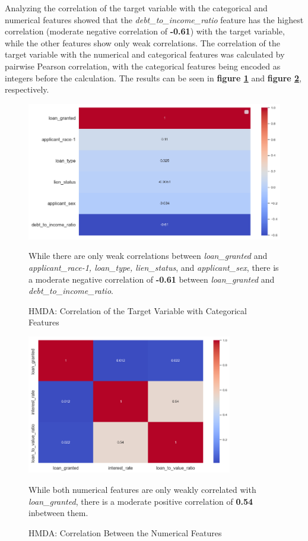 Analyzing the correlation of the target variable with the categorical and numerical features showed that the \textit{debt\_to\_income\_ratio} feature has the highest correlation (moderate negative correlation of \textbf{-0.61}) with the target variable, while the other features show only weak correlations. 
The correlation of the target variable with the numerical and categorical features was calculated by pairwise Pearson correlation, with the categorical features being encoded as integers before the calculation.
The results can be seen in \textbf{figure \ref{fig:CHXX_Target_Correlation_Categorical}} and \textbf{figure \ref{fig:CHXX_Target_Correlation_Numerical}}, respectively.

\begin{figure}[hbt!]
    \centering
    \includegraphics[width=1\textwidth]{images/CHXX_Target_Correlation_Categorical.png}
    \caption{HMDA: Correlation of the Target Variable with Categorical Features}
    \medskip
    \small
    While there are only weak correlations between \textit{loan\_granted} and \textit{applicant\_race-1, loan\_type, lien\_status}, and \textit{applicant\_sex}, there is a moderate negative correlation of \textbf{-0.61} between \textit{loan\_granted} and \textit{debt\_to\_income\_ratio}.
    \label{fig:CHXX_Target_Correlation_Categorical}
\end{figure}

\begin{figure}[!htbp]
    \centering
    \includegraphics[width=0.8\textwidth]{images/CHXX_Target_Correlation_Numerical.png}
    \caption{HMDA: Correlation Between the Numerical Features}
    \medskip
    \small
    While both numerical features are only weakly correlated with \textit{loan\_granted}, there is a moderate positive correlation of \textbf{0.54} inbetween them.
    \label{fig:CHXX_Target_Correlation_Numerical}
\end{figure}

